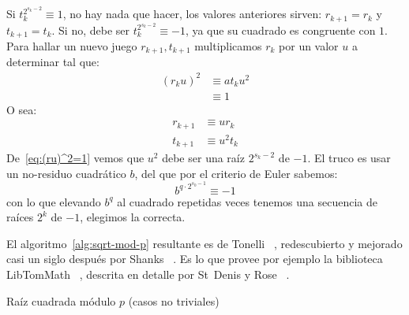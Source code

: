 \documentclass[english, german, spanish, fleqn]{article}
\begin{document}
  Si \(t_k^{2^{s_k - 2}} \equiv 1\),
  no hay nada que hacer,
  los valores anteriores sirven:
  \(r_{k + 1} = r_k\) y \(t_{k + 1} = t_k\).
  Si no,
  debe ser \(t_k^{2^{s_k - 2}} \equiv -1\),
  ya que su cuadrado es congruente con \(1\).
  Para hallar un nuevo juego \(r_{k + 1}, t_{k + 1}\)
  multiplicamos \(r_k\) por un valor \(u\) a determinar
  tal que:
  \begin{align}
    (r_k u)^2
      &\equiv a t_k u^2 \\
      &\equiv 1 \label{eq:(ru)^2=1}
  \end{align}
  O sea:
  \begin{align*}
    r_{k + 1}
      &\equiv u r_k \\
    t_{k + 1}
      &\equiv u^2 t_k
  \end{align*}
  De~\eqref{eq:(ru)^2=1}
  vemos que \(u^2\) debe ser una raíz \(2^{s_k - 2}\) de \(-1\).
  El truco es usar un no\nobreakdash-residuo cuadrático \(b\),
  del que por el criterio de Euler sabemos:
  \begin{equation*}
    b^{q \cdot 2^{s_0 - 1}}
      \equiv -1
  \end{equation*}
  con lo que elevando \(b^q\) al cuadrado repetidas veces
  tenemos una secuencia de raíces \(2^k\) de \(-1\),
  elegimos la correcta.

  El algoritmo~\ref{alg:sqrt-mod-p} resultante es de Tonelli~%
     \cite{tonelli91:_bemerkung_aufloesung_congruenzen},
  redescubierto y mejorado casi un siglo después por Shanks~%
    \cite{shanks72:_five_number_theoretic_algorithms}.
  Es lo que provee por ejemplo la biblioteca LibTomMath~%
    \cite{teamtom19:_libtommath_1.2.0},
  descrita en detalle por St~Denis y Rose~%
    \cite{st_denis06:_bignum_math}.
  \begin{algorithm}
    \DontPrintSemicolon

    \caption{Raíz cuadrada módulo \(p\)
             (casos no triviales)}
    \label{alg:sqrt-mod-p}
  \end{algorithm}
  
\end{document}
